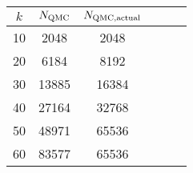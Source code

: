 \begin{tabular}{Sc Sc Sc }

\toprule

$k$ & $N_{\mathrm{QMC}}$ & $N_{\mathrm{QMC,actual}}$\\
\midrule

10 &    2048 &          2048 \\

20 &    6184 &          8192 \\

30 &   13885 &         16384 \\

40 &   27164 &         32768 \\

50 &   48971 &         65536 \\

60 &   83577 &         65536 \\

\bottomrule

\end{tabular}

